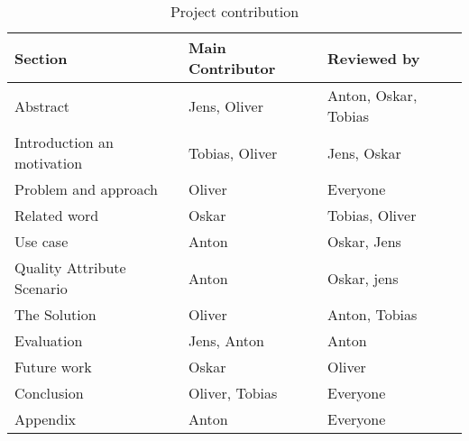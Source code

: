 

\begin{table}[H]
\begin{tabular}{|l|l|l|}
\hline
Section                    & Main Contributor & Reviewed by          \\ \hline
Abstract                   & Jens, Oliver    & Anton, Oskar, Tobias \\ \hline
Introduction an motivation & Tobias, Oliver  & Jens, Oskar          \\ \hline
Problem and approach       & Oliver          & Everyone             \\ \hline
Related word               & Oskar           & Tobias, Oliver       \\ \hline
Use case                   & Anton           & Oskar, Jens          \\ \hline
Quality Attribute Scenario & Anton           & Oskar, jens          \\ \hline
The Solution               & Oliver          & Anton, Tobias        \\ \hline
Evaluation                 & Jens, Anton     & Anton                \\ \hline
Future work                & Oskar           & Oliver               \\ \hline
Conclusion                 & Oliver, Tobias  & Everyone             \\ \hline
Appendix                   & Anton           & Everyone             \\ \hline
\end{tabular}
\caption{\label{tab:project_contribution} Project contribution}
\end{table}

